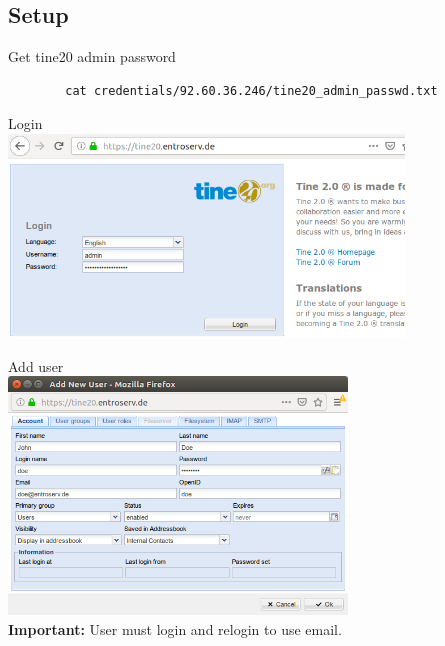 \documentclass{beamer}
\begin{document}
\subsection{Setup}
\begin{frame}[fragile]{\insertsection}{\insertsubsection}
	\vspace{-0.5cm}
	Get tine20 admin password
	\begin{verbatim}
		cat credentials/92.60.36.246/tine20_admin_passwd.txt
	\end{verbatim}
	Login\\
	\includegraphics[width=10.5cm]{tine20login.png}
\end{frame}	

\begin{frame}[fragile]{\insertsection}{\insertsubsection}
	\vspace{-0.5cm}
	Add user\\
	\includegraphics[width=9cm]{tine20adduser.png}\\
	\textbf{Important:} User must login and relogin to use email.
\end{frame}	
\end{document}

